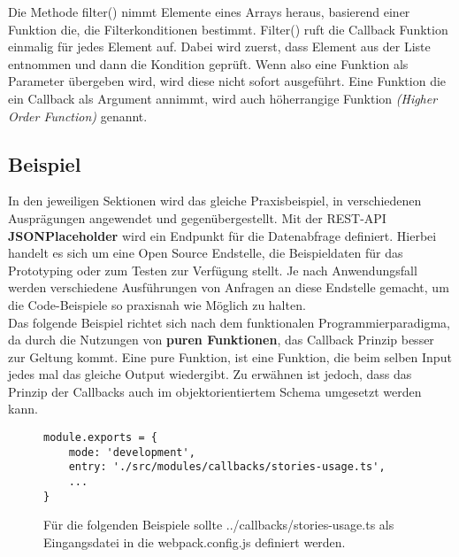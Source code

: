 \noindent
Die Methode filter() nimmt Elemente eines Arrays heraus, basierend einer Funktion die, die Filterkonditionen bestimmt. Filter() ruft die Callback Funktion einmalig für jedes Element auf. Dabei wird zuerst, dass Element aus der Liste entnommen und dann die Kondition geprüft. Wenn also eine Funktion als Parameter übergeben wird, wird diese nicht sofort ausgeführt. Eine Funktion die ein Callback als Argument annimmt, wird auch höherrangige Funktion \textit{(Higher Order Function)} genannt\cite{callbacks-example}.

\subsection{Beispiel}
In den jeweiligen Sektionen wird das gleiche Praxisbeispiel, in verschiedenen Ausprägungen angewendet und gegenübergestellt. Mit der REST-API \textbf{JSONPlaceholder} wird ein Endpunkt für die Datenabfrage definiert. Hierbei handelt es sich um eine Open Source Endstelle, die Beispieldaten für das Prototyping oder zum Testen zur Verfügung stellt. Je nach Anwendungsfall werden verschiedene Ausführungen von Anfragen an diese Endstelle gemacht, um die Code-Beispiele so praxisnah wie Möglich zu halten.\\

\noindent
Das folgende Beispiel richtet sich nach dem funktionalen Programmierparadigma, da durch die Nutzungen von \textbf{puren Funktionen}, das Callback Prinzip besser zur Geltung kommt. Eine pure Funktion, ist eine Funktion, die beim selben Input jedes mal das gleiche Output wiedergibt. Zu erwähnen ist jedoch, dass das Prinzip der Callbacks auch im objektorientiertem Schema umgesetzt werden kann. 

\begin{figure}[H]
\begin{lstlisting}[basicstyle=\small]
module.exports = {
    mode: 'development',
    entry: './src/modules/callbacks/stories-usage.ts',
    ...
}
\end{lstlisting}
\caption{Für die folgenden Beispiele sollte ../callbacks/stories-usage.ts als Eingangsdatei in die webpack.config.js definiert werden.}
\end{figure}

